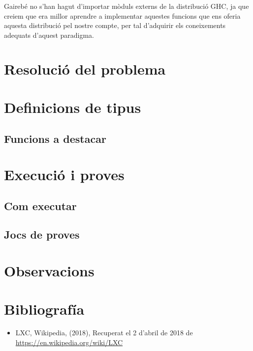 \documentclass[12pt]{article}
\begin{document}
Gairebé no s'han hagut d'importar mòduls externs de la distribució GHC, ja que creiem que era millor aprendre a implementar aquestes funcions que ens oferia aquesta distribució pel nostre compte, per tal d'adquirir els coneixements adequats d'aquest paradigma.


\section{Resolució del problema}

\section{Definicions de tipus}
\subsection{Funcions a destacar}

\section{Execució i proves}
\subsection{Com executar}
\subsection{Jocs de proves}

\section{Observacions}

\newpage
\section{Bibliografía}

\begin{itemize}[label={}]

\item LXC, Wikipedia, (2018), Recuperat el 2 d'abril de 2018 de \url{https://en.wikipedia.org/wiki/LXC}

\end{itemize}
\end{document}
